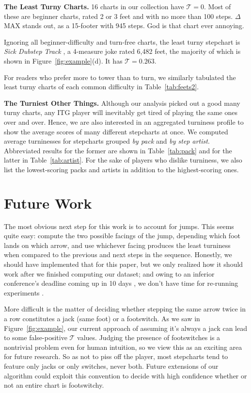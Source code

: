 \documentclass[10pt]{sigplanconf}
\begin{document}
{\bf The Least Turny Charts.}
16 charts in our collection have $\mathcal{T}=0$. Most of these are beginner charts, rated 2 or 3 feet and with no more than 100 steps. $\Delta$MAX \cite{deltamax} stands out, as a 15-footer with 945 steps. God is that chart ever annoying.

Ignoring all beginner-difficulty and turn-free charts, the least turny stepchart is {\em Sick Dubstep Track} \cite{sickdubstep}, a 4-measure joke rated 6,482 feet, the majority of which is shown in Figure~\ref{fig:example}(d). It has $\mathcal{T}=0.263$.

For readers who prefer more to tower than to turn, we similarly tabulated the least turny charts of each common difficulty in Table~\ref{tab:feets2}.

{\bf The Turniest Other Things.}
Although our analysis picked out a good many turny charts, any ITG player will inevitably get tired of playing the same ones over and over.
Hence, we are also interested in an aggregated turniness profile to show the average scores of many different stepcharts at once.
We computed average turninesses for stepcharts grouped {\em by pack} and {\em by step artist}.
Abbreviated results for the former are shown in Table~\ref{tab:pack} and for the latter in Table~\ref{tab:artist}.
For the sake of players who dislike turniness, we also list the lowest-scoring packs and artists in addition to the highest-scoring ones.

\section{Future Work}

The most obvious next step for this work is to account for jumps.
This seems quite easy: compute the two possible facings of the jump, depending which foot lands on which arrow, and use whichever facing produces the least turniness when compared to the previous and next steps in the sequence.
Honestly, we should have implemented that for this paper, but we only realized how it should work after we finished computing our dataset;
and owing to an inferior conference's deadline coming up in 10 days , we don't have time for re-running experiments .

More difficult is the matter of deciding whether stepping the same arrow twice in a row constitutes a jack (same foot) or a footswitch. As we saw in Figure~\ref{fig:example}, our current approach of assuming it's always a jack can lead to some false-positive $\mathcal{T}$ values.
Judging the presence of footswitches is a nontrivial problem even for human intuition, so we view this as an exciting area for future research.
So as not to piss off the player, most stepcharts tend to feature only jacks or only switches, never both.
Future extensions of our algorithm could exploit this convention to decide with high confidence whether or not an entire chart is footswitchy.
\end{document}
